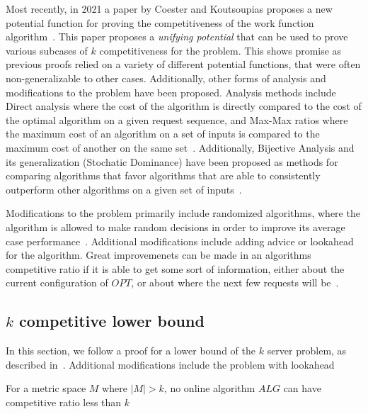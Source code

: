 Most recently, in 2021 a paper by Coester and Koutsoupias proposes a new potential function for proving the competitiveness of the work function algorithm~\cite{unifyingPotential2021}. This paper proposes a \textit{unifying potential} that can be used to prove various subcases of $k$ competitiveness for the \KS problem. This shows promise as previous proofs relied on a variety of different potential functions, that were often non-generalizable to other cases.
Additionally, other forms of analysis and modifications to the \KS problem have been proposed. Analysis methods include Direct analysis where the cost of the algorithm is directly compared to the cost of the optimal algorithm on a given request sequence, and Max-Max ratios where the maximum cost of an algorithm on a set of inputs is compared to the maximum cost of another on the same set~\cite{MAXMAX2005}. Additionally, Bijective Analysis and its generalization (Stochatic Dominance) have been proposed as methods for comparing algorithms that favor algorithms that are able to consistently outperform other algorithms on a given set of inputs~\cite{bij2016}. 

Modifications to the \KS problem primarily include randomized algorithms, where the algorithm is allowed to make random decisions in order to improve its average case performance~\cite{OnlineComp1998}. Additional modifications include adding advice or lookahead for the algorithm. Great improvemenets can be made in an algorithms competitive ratio if it is able to get some sort of information, either about the current configuration of $OPT$, or about where the next few requests will be~\cite{advice2015}.

\subsection{$k$ competitive lower bound}
\label{sec:lowerBound}

In this section, we follow a proof for a lower bound of the $k$ server problem, as described in~\cite{server2009}. Additional modifications include the \KS problem with lookahead~\cite{}

\begin{lemma}
    For a metric space $M$ where $|M| > k$, no online algorithm $ALG$ can have competitive ratio less than $k$
\end{lemma}

